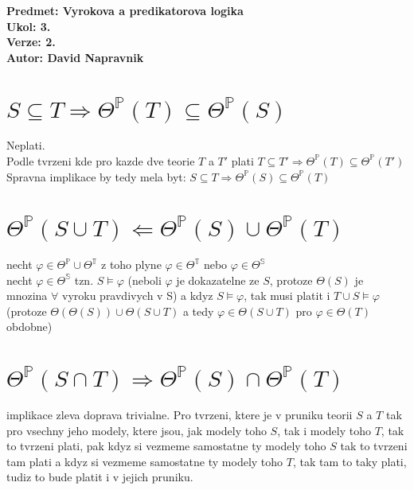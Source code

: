 \documentclass[a4paper]{article}
\begin{document}
\noindent
\textbf{Predmet: Vyrokova a predikatorova logika}\\
\textbf{Ukol: 3.}\\
\textbf{Verze: 2.}\\
\textbf{Autor: David Napravnik}

\section*{$S \subseteq T \Rightarrow \Theta^{\mathbb{P}}(T) \subseteq \Theta^{\mathbb{P}}(S)$}
Neplati.\\
Podle tvrzeni kde pro kazde dve teorie $T$ a $T'$ plati $T \subseteq T' \Rightarrow \Theta^{\mathbb{P}}(T) \subseteq \Theta^{\mathbb{P}}(T')$\\
Spravna implikace by tedy mela byt: $S \subseteq T \Rightarrow \Theta^{\mathbb{P}}(S) \subseteq \Theta^{\mathbb{P}}(T)$


\section*{$\Theta^{\mathbb{P}}(S \cup T) \Leftarrow \Theta^{\mathbb{P}}(S) \cup \Theta^{\mathbb{P}}(T)$}

necht $\varphi \in \Theta^{\mathbb{P}} \cup \Theta^{\mathbb{T}}$ z toho plyne
$\varphi \in \Theta^{\mathbb{T}}$ nebo $\varphi \in \Theta^{\mathbb{S}}$\\
necht $\varphi \in \Theta^{\mathbb{S}}$ tzn. $S\models\varphi$ (neboli
$\varphi$ je dokazatelne ze $S$, protoze $\Theta(S)$ je mnozina
$\forall$ vyroku pravdivych v S) a kdyz $S\models\varphi$, tak musi
platit i $T \cup S\models\varphi$ (protoze $\Theta(\Theta(S)) \cup \Theta(S\cup T)$ a tedy 
$\varphi \in \Theta(S\cup T)$ pro $\varphi \in \Theta(T)$ obdobne)



\section*{$\Theta^{\mathbb{P}}(S \cap T)
\Rightarrow \Theta^{\mathbb{P}}(S) \cap \Theta^{\mathbb{P}}(T)$}
implikace zleva doprava trivialne. Pro tvrzeni, ktere je v pruniku teorii $S$ a $T$
tak pro vsechny jeho modely, ktere jsou, jak modely toho $S$,
tak i modely toho $T$, tak to tvrzeni plati, pak kdyz si vezmeme
samostatne ty modely toho $S$ tak to tvrzeni tam plati a kdyz si vezmeme
samostatne ty modely toho $T$, tak tam to taky plati,
tudiz to bude platit i v jejich pruniku. 
\end{document}
